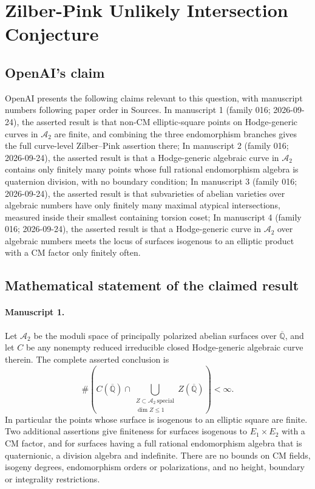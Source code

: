 \documentclass[11pt]{article}
\begin{document}
\section*{Zilber-Pink Unlikely Intersection Conjecture}

\subsection{OpenAI's claim}
OpenAI presents the following claims relevant to this question, with manuscript numbers following paper order in Sources. In manuscript 1 (family 016; 2026-09-24), the asserted result is that non-CM elliptic-square points on Hodge-generic curves in $\mathcal A_2$ are finite, and combining the three endomorphism branches gives the full curve-level Zilber--Pink assertion there; In manuscript 2 (family 016; 2026-09-24), the asserted result is that a Hodge-generic algebraic curve in $\mathcal A_2$ contains only finitely many points whose full rational endomorphism algebra is quaternion division, with no boundary condition; In manuscript 3 (family 016; 2026-09-24), the asserted result is that subvarieties of abelian varieties over algebraic numbers have only finitely many maximal atypical intersections, measured inside their smallest containing torsion coset; In manuscript 4 (family 016; 2026-09-24), the asserted result is that a Hodge-generic curve in $\mathcal A_2$ over algebraic numbers meets the locus of surfaces isogenous to an elliptic product with a CM factor only finitely often.

\subsection{Mathematical statement of the claimed result}
\paragraph{Manuscript 1.}
Let $\mathcal A_2$ be the moduli space of principally polarized abelian surfaces over $\overline{\mathbb Q}$, and let $C$ be any nonempty reduced irreducible closed Hodge-generic algebraic curve therein. The complete asserted conclusion is
\[
 \#\left(C(\overline{\mathbb Q})\cap
 \bigcup_{\substack{Z\subset\mathcal A_2\ \mathrm{special}\\\dim Z\le1}}
 Z(\overline{\mathbb Q})\right)<\infty.
\]
In particular the points whose surface is isogenous to an elliptic square are finite. Two additional assertions give finiteness for surfaces isogenous to $E_1\times E_2$ with a CM factor, and for surfaces having a full rational endomorphism algebra that is quaternionic, a division algebra and indefinite. There are no bounds on CM fields, isogeny degrees, endomorphism orders or polarizations, and no height, boundary or integrality restrictions.
\end{document}

